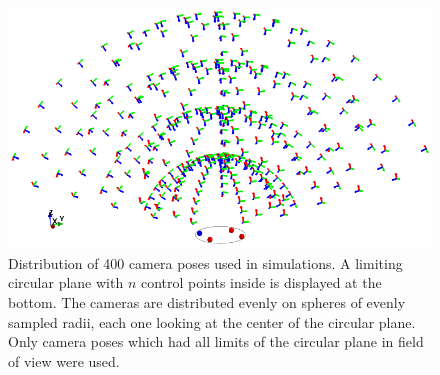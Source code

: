 \documentclass[letterpaper, 10 pt, conference]{ieeeconf}  %
\begin{document}
	
	
	
	
	\begin{figure}[t]
		\begin{center}
			\includegraphics[width=\columnwidth]{img/cam_config3D.png}
			\caption{\label{fig:camera_poses} \small Distribution of 400 camera poses used in simulations. A limiting circular plane with $n$ control points inside is displayed at the bottom. The cameras are distributed evenly on spheres of evenly sampled radii, each one looking at the center of the circular plane. Only camera poses which had all limits of the circular plane in field of view were used.}
		\end{center}
		\vspace{-0.7cm}
	\end{figure}
	
	
	
\end{document}
